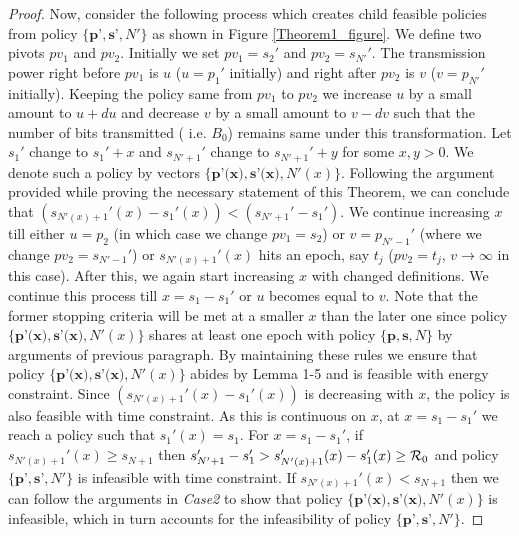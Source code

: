 \begin{proof}
Now, consider the following process which creates child feasible policies from policy $\{\textbf{p'},\textbf{s'},N'\}$ as shown in Figure \ref{Theorem1_figure}. We define two pivots $pv_1$ and $pv_2$. Initially we set $pv_1=s_2'$ and $pv_2=s_{N'}'$. The transmission power right before $pv_1$ is $u$ ($u=p_1'$ initially) and right after $pv_2$ is $v$ ($v=p_{N'}'$ initially). Keeping the policy same from $pv_1$ to $pv_2$ we increase $u$ by a small amount to $u+du$ and decrease $v$ by a small amount to $v-dv$ such that the number of bits transmitted ( i.e. $B_0$) remains same under this transformation. Let $s_1'$ change to $s_1'+x$ and $s_{N'+1}'$ change to $s_{N'+1}'+y$ for some $x,y>0$. We denote such a policy by vectors $\{\textbf{p'(x)},\textbf{s'(x)},N'(x)\}$. Following the argument provided while proving the necessary statement of this Theorem, we can conclude that $(s_{N'(x)+1}'(x)-s_1'(x))<(s_{N'+1}'-s_1')$. We continue increasing $x$ till either $u=p_2$ (in which case we change $pv_1=s_2$) or $v=p_{N'-1}'$ (where we change $pv_2=s_{N'-1}'$) or $s_{N'(x)+1}'(x)$ hits an epoch, say $t_j$ ($pv_2=t_j$, $v\rightarrow\infty$ in this case). After this, we again start increasing $x$ with changed definitions. We continue this process till $x=s_1-s_1'$  or $u$ becomes equal to $v$. Note that the former stopping criteria will be met at a smaller $x$ than the later one since policy $\{\textbf{p'(x)},\textbf{s'(x)},N'(x)\}$ shares at least one epoch with policy $\{\textbf{p},\textbf{s},N\}$ by arguments of previous paragraph. By maintaining these rules we ensure that policy $\{\textbf{p'(x)},\textbf{s'(x)},N'(x)\}$ abides by Lemma 1-5 and is feasible with energy constraint. Since $\left( s_{N'(x)+1}'(x)-s_1'(x)\right)$ is decreasing with $x$, the policy is also feasible with time constraint. As this is continuous on $x$, at $x=s_1-s_1'$ we reach a policy such that $s_1'(x)=s_1$. For $x=s_1-s_1'$, if $s_{N'(x)+1}'(x)\ge s_{N+1}$ then $s_{N'+1}'-s_1'>s_{N'(x)+1}'(x)-s_1'(x)\ge \mathcal{R}_0$ and policy $\{\textbf{p'},\textbf{s'},N'\}$ is infeasible with time constraint. If $s_{N'(x)+1}'(x)< s_{N+1}$ then we can follow the arguments in \textit{Case2} to show that policy $\{\textbf{p'(x)},\textbf{s'(x)},N'(x)\}$ is infeasible, which in turn accounts for the infeasibility of policy $\{\textbf{p'},\textbf{s'},N'\}$.
\end{proof}

























